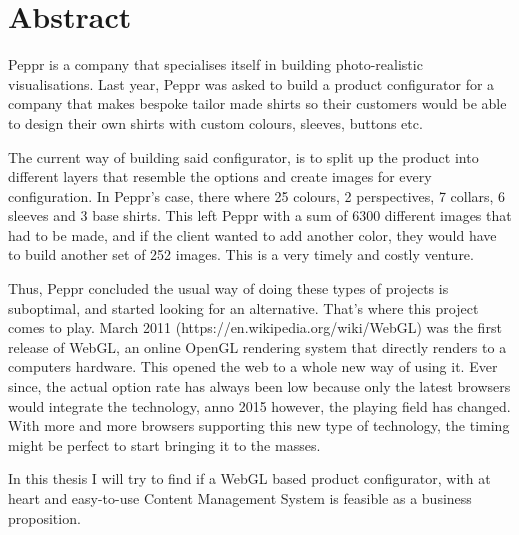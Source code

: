 \newpage
\section{Abstract}

Peppr is a company that specialises itself in building photo-realistic visualisations. Last year, Peppr was asked to build a product configurator for a company that makes bespoke tailor made shirts so their customers would be able to design their own shirts with custom colours, sleeves, buttons etc. 

The current way of building said configurator, is to split up the product into different layers that resemble the options and create images for every configuration. In Peppr's case, there where 25 colours, 2 perspectives, 7 collars, 6 sleeves and 3 base shirts. This left Peppr with a sum of 6300 different images that had to be made, and if the client wanted to add another color, they would have to build another set of 252 images. This is a very timely and costly venture.

Thus, Peppr concluded the usual way of doing these types of projects is suboptimal, and started looking for an alternative. That's where this project comes to play. March 2011 (https://en.wikipedia.org/wiki/WebGL) was the first release of WebGL, an online OpenGL rendering system that directly renders to a computers hardware. This opened the web to a whole new way of using it. Ever since, the actual option rate has always been low because only the latest browsers would integrate the technology, anno 2015 however, the playing field has changed. With more and more browsers supporting this new type of technology, the timing might be perfect to start bringing it to the masses.

In this thesis I will try to find if a WebGL based product configurator, with at heart and easy-to-use Content Management System is feasible as a business proposition.
\newpage